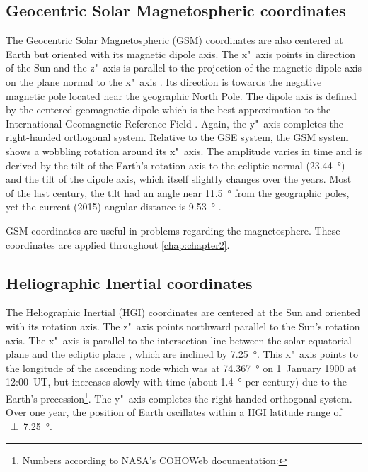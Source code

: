 \subsection*{Geocentric Solar Magnetospheric coordinates}
The Geocentric Solar Magnetospheric (GSM) coordinates are also centered at Earth but oriented with its magnetic dipole axis. The x"~axis points in direction of the Sun and the z"~axis is parallel to the projection of the magnetic dipole axis on the plane normal to the x"~axis \citep{Russell1971,Hapgood1992}. Its direction is towards the negative magnetic pole located near the geographic North Pole. The dipole axis is defined by the centered geomagnetic dipole which is the best approximation to the International Geomagnetic Reference Field \citep{Thebault2015}. Again, the y"~axis completes the right-handed orthogonal system.
Relative to the GSE system, the GSM system shows a wobbling rotation around its x"~axis. The amplitude varies in time and is derived by the tilt of the Earth's rotation axis to the ecliptic normal (\SI{23.44}{\degree}) and the tilt of the dipole axis, which itself slightly changes over the years. Most of the last century, the tilt had an angle near \SI{11.5}{\degree} from the geographic poles, yet the current (2015) angular distance is \SI{9.53}{\degree} \citep{Thebault2015}.

GSM coordinates are useful in problems regarding the magnetosphere. These coordinates are applied throughout \autoref{chap:chapter2}.

\subsection*{Heliographic Inertial coordinates}
The Heliographic Inertial (HGI) coordinates are centered at the Sun and oriented with its rotation axis. The z"~axis points northward parallel to the Sun's rotation axis. The x"~axis is parallel to the intersection line between the solar equatorial plane and the ecliptic plane \citep{Burlaga1984a}, which are inclined by \SI{7.25}{\degree}. This x"~axis points to the longitude of the ascending node which was at \SI{74.367}{\degree} on 1~January 1900 at 12:00~UT, but increases slowly with time (about \SI{1.4}{\degree} per century) due to the Earth's precession\footnote{Numbers according to NASA's COHOWeb documentation: }. The y"~axis completes the right-handed orthogonal system.
Over one year, the position of Earth oscillates within a HGI latitude range of \SI{+-7.25}{\degree}.

